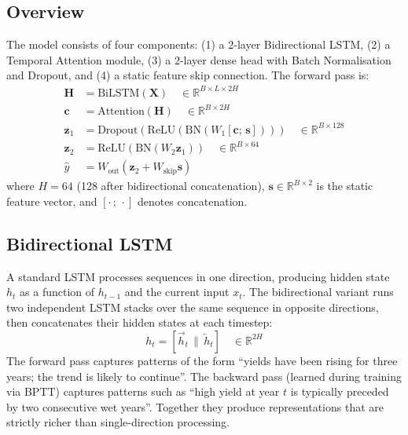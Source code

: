 \documentclass[conference]{IEEEtran}
\begin{document}
\subsection{Overview}
The model consists of four components:
(1) a 2-layer Bidirectional LSTM,
(2) a Temporal Attention module,
(3) a 2-layer dense head with Batch Normalisation and Dropout, and
(4) a static feature skip connection.
The forward pass is:
\begin{equation}
\begin{aligned}
    \mathbf{H}         &= \text{BiLSTM}(\mathbf{X}) \quad \in \mathbb{R}^{B \times L \times 2H} \\
    \mathbf{c}         &= \text{Attention}(\mathbf{H}) \quad \in \mathbb{R}^{B \times 2H} \\
    \mathbf{z}_1       &= \text{Dropout}(\text{ReLU}(\text{BN}(W_1[\mathbf{c};\,\mathbf{s}])))
                          \quad \in \mathbb{R}^{B \times 128} \\
    \mathbf{z}_2       &= \text{ReLU}(\text{BN}(W_2 \mathbf{z}_1))
                          \quad \in \mathbb{R}^{B \times 64} \\
    \hat{y}            &= W_{\text{out}}(\mathbf{z}_2 + W_{\text{skip}}\mathbf{s})
\end{aligned}
\end{equation}
where $H{=}64$ (128 after bidirectional concatenation),
$\mathbf{s} \in \mathbb{R}^{B \times 2}$ is the static feature vector,
and $[\cdot\,;\,\cdot]$ denotes concatenation.

\subsection{Bidirectional LSTM}
\label{sec:bilstm}

A standard LSTM processes sequences in one direction, producing hidden state
$h_t$ as a function of $h_{t-1}$ and the current input $x_t$.
The bidirectional variant runs two independent LSTM stacks over the same sequence
in opposite directions, then concatenates their hidden states at each timestep:
\begin{equation}
    h_t = [\overrightarrow{h}_t \,\|\, \overleftarrow{h}_t]
    \quad \in \mathbb{R}^{2H}
\end{equation}
The forward pass captures patterns of the form ``yields have been rising for
three years; the trend is likely to continue''.
The backward pass (learned during training via BPTT) captures patterns such as
``high yield at year $t$ is typically preceded by two consecutive wet years''.
Together they produce representations that are strictly richer than single-direction
processing.
\end{document}
